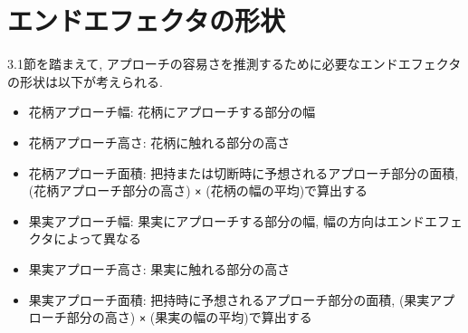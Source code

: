 \section{エンドエフェクタの形状}
3.1節を踏まえて, アプローチの容易さを推測するために必要なエンドエフェクタの形状は以下が考えられる.

\begin{itemize}
  \item 花柄アプローチ幅: 花柄にアプローチする部分の幅
  \item 花柄アプローチ高さ: 花柄に触れる部分の高さ
  \item 花柄アプローチ面積: 把持または切断時に予想されるアプローチ部分の面積, (花柄アプローチ部分の高さ) \verb|×| (花柄の幅の平均)で算出する
  \item 果実アプローチ幅: 果実にアプローチする部分の幅, 幅の方向はエンドエフェクタによって異なる
  \item 果実アプローチ高さ: 果実に触れる部分の高さ
  \item 果実アプローチ面積: 把持時に予想されるアプローチ部分の面積, (果実アプローチ部分の高さ) \verb|×| (果実の幅の平均)で算出する
\end{itemize}
